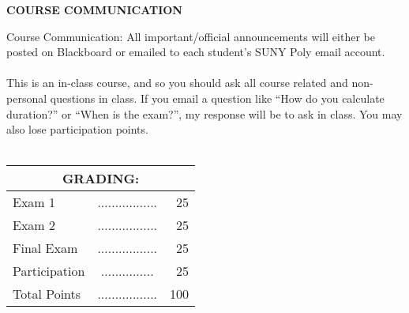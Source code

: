 \documentclass{article}
\begin{document}
\begin{center}
{\bf COURSE COMMUNICATION}
\end{center}
Course Communication: All important/official announcements will either be posted on Blackboard
or emailed to each student's SUNY Poly email account.\\
\\
This is an in-class course, and so you should ask all course related and non-personal questions in class.  If you email a question like ``How do you calculate duration?'' or ``When is the exam?'', my response will be to ask in class.  You may also lose participation points.\\
\\
\begin{center}
\begin{tabular}{lcr}
\multicolumn{3}{c}{\bf GRADING:} \\ \hline
Exam 1 & ................. & 25 \\

Exam 2 & ................. & 25 \\

Final Exam & ................. & 25 \\


Participation & ............... &  25\\
  



Total Points & ................. & 100\\
\end{tabular}
\end{center}
\end{document}
